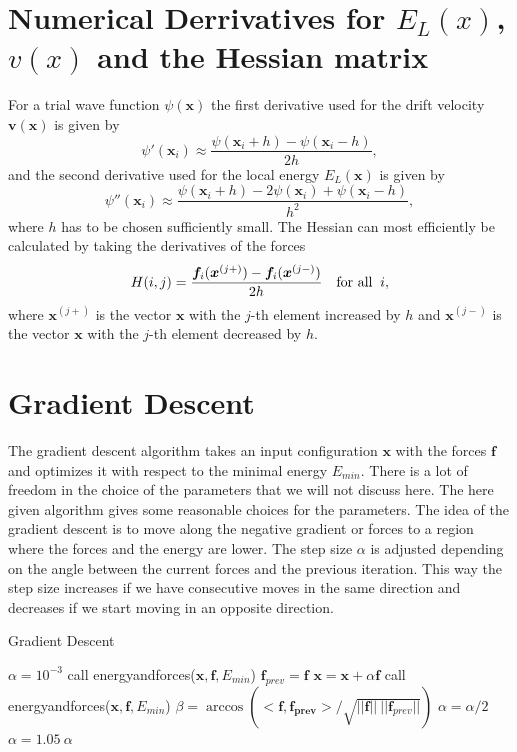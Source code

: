\documentclass [12pt]{report}
\begin{document}
\begin{appendices}
\chapter{Numerical Derrivatives for $E_L(x)$, $v(x)$ and the Hessian matrix} \label{appendixC}
For a trial wave function $\psi(\bm{x})$ the first derivative used for the drift velocity $\bm{v}(\bm{x})$ is given by
\begin{equation}
\psi'(\bm{x}_i) \approx \frac{\psi(\bm{x}_i + h) - \psi(\bm{x}_i - h)}{2h},
\end{equation}
and the second derivative used for the local energy $E_L(\bm{x})$ is given by
\begin{equation}
\psi''(\bm{x}_i) \approx \frac{\psi(\bm{x}_i + h) - 2 \psi(\bm{x}_i) + \psi(\bm{x}_i - h)}{h^2},
\end{equation}
where $h$ has to be chosen sufficiently small.
The Hessian can most efficiently be calculated by taking the derivatives of the forces
\begin{equation}
H(i,j) = \frac{\bm{f}_i(\bm{x}^{(j+)}) - \bm{f}_i(\bm{x}^{(j-)})}{2h} \mbox{\quad for all \:} i,
\end{equation}
where $\bm{x}^{(j+)}$ is the vector $\bm{x}$ with the $j$-th element increased by $h$ and $\bm{x}^{(j-)}$ is the vector $\bm{x}$ with the $j$-th element decreased by $h$.
\chapter{Gradient Descent} \label{gradient_descent}
The gradient descent algorithm takes an input configuration $\bm{x}$ with the forces $\bm{f}$ and optimizes it with respect to the minimal energy $E_{min}$. There is a lot of freedom in the choice of the parameters that we will not discuss here. The here given algorithm gives some reasonable choices for the parameters. The idea of the gradient descent is to move along the negative gradient or forces to a region where the forces and the energy are lower. The step size $\alpha$ is adjusted depending on the angle between the current forces and the previous iteration. This way the step size increases if we have consecutive moves in the same direction and decreases if we start moving in an opposite direction. 
\begin{algorithm}
\caption{Gradient Descent}\label{grad_desc}
\begin{algorithmic}[1]
 
\State $\alpha = 10^{-3}$
\State call energyandforces($\bm{x}, \bm{f}, E_{min}$)
 
	\State $\bm{f}_{prev} = \bm{f}$	
	\State $\bm{x} = \bm{x} + \alpha \bm{f}$
	\State call energyandforces($\bm{x}, \bm{f}, E_{min}$)
	\State $\beta = \arccos{(<\bm{f},\bm{f_{prev}}>/\sqrt{||\bm{f}||\:||\bm{f}_{prev}||})}$ 
	 
		\State $\alpha = \alpha/2$
	\Else
		\State $\alpha = 1.05\ \alpha$
	\EndIf
\EndWhile
\EndProcedure
\end{algorithmic}
\end{algorithm}


\end{appendices}
\end{document}
